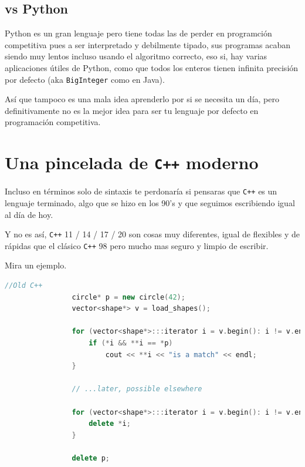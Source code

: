 \documentclass[12pt, fleqn]{report}                             %
\theoremstyle{break}                                            %
\newcommand{\textCode}[1]  { \texttt{#1} }                      %
\newcommand \Cpp  {\textCode{C++} }                               %
\begin{document}
            \subsection{vs Python}

                Python es un gran lenguaje pero tiene todas las de perder en programción competitiva pues
                a ser interpretado y debilmente tipado, sus programas acaban siendo muy lentos incluso usando el 
                algoritmo correcto, eso si, hay varias aplicaciones útiles de Python, como que todos los
                enteros tienen infinita precisión por defecto (aka \textCode{BigInteger} como en Java).

                Así que tampoco es una mala idea aprenderlo por si se necesita un día, pero definitivamente
                no es la mejor idea para ser tu lenguaje por defecto en programación competitiva.


        \clearpage
        \section{ Una pincelada de \Cpp moderno}

            Incluso en términos solo de sintaxis te perdonaría si pensaras que \Cpp es un
            lenguaje terminado, algo que se hizo en los 90's y que seguimos escribiendo
            igual al día de hoy.

            Y no es así, \Cpp 11 / 14 / 17 / 20 son cosas muy diferentes, igual de flexibles
            y de rápidas que el clásico \Cpp 98 pero mucho mas seguro y limpio de escribir.

            Mira un ejemplo.

            \begin{lstlisting}[language=C++, gobble=16]
                //Old C++
                circle* p = new circle(42);
                vector<shape*> v = load_shapes();

                for (vector<shape*>:::iterator i = v.begin(): i != v.end(); ++i) {
                    if (*i && **i == *p)
                        cout << **i << "is a match" << endl;
                }

                // ...later, possible elsewhere

                for (vector<shape*>:::iterator i = v.begin(): i != v.end(); ++i) {
                    delete *i;
                }

                delete p;
            \end{lstlisting}
\end{document}
